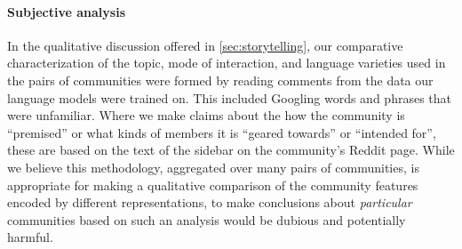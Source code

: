 \documentclass[11pt]{article}
\begin{document}
\paragraph{Subjective analysis}
In the qualitative discussion offered in \cref{sec:storytelling},
our comparative characterization of the topic, mode of interaction, 
and language varieties
used in the pairs of communities were formed by reading comments from the data our 
language models were trained on. This included Googling words and phrases that 
were unfamiliar. 
Where we make claims about the how the community is ``premised'' or what kinds of 
members it is ``geared towards'' or ``intended for'', these are based on the text
of the sidebar on the community's Reddit page.
While we believe this methodology, aggregated over many pairs of communities, 
is appropriate for making a qualitative comparison
of the community features encoded by different representations, 
to make conclusions about \emph{particular} communities based on such 
an analysis would be dubious and potentially harmful.




\end{document}
